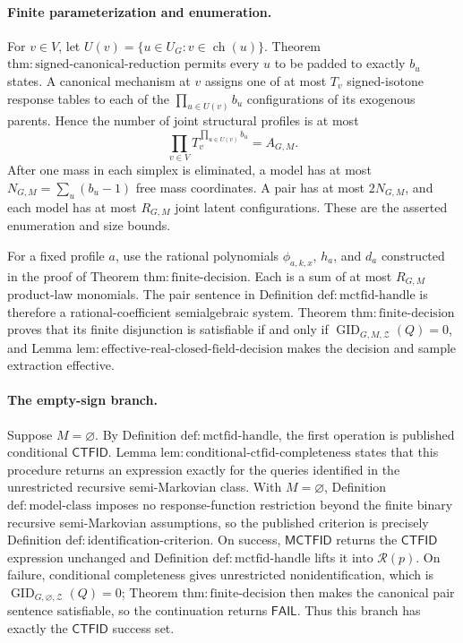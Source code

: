\paragraph{Finite parameterization and enumeration.}
For \(v\in V\), let \(U(v)=\{u\in U_G:v\in\operatorname{ch}(u)\}\).  Theorem \(\mathrm{thm:signed\text{-}canonical\text{-}reduction}\) permits every \(u\) to be padded to exactly \(b_u\) states.  A canonical mechanism at \(v\) assigns one of at most \(T_v\) signed-isotone response tables to each of the \(\prod_{u\in U(v)}b_u\) configurations of its exogenous parents.  Hence the number of joint structural profiles is at most
\[
 \prod_{v\in V}T_v^{\prod_{u\in U(v)}b_u}=A_{G,M}.
\]
After one mass in each simplex is eliminated, a model has at most \(N_{G,M}=\sum_u(b_u-1)\) free mass coordinates.  A pair has at most \(2N_{G,M}\), and each model has at most \(R_{G,M}\) joint latent configurations.  These are the asserted enumeration and size bounds.

For a fixed profile \(a\), use the rational polynomials \(\phi_{a,k,x}\), \(h_a\), and \(d_a\) constructed in the proof of Theorem \(\mathrm{thm:finite\text{-}decision}\).  Each is a sum of at most \(R_{G,M}\) product-law monomials.  The pair sentence in Definition \(\mathrm{def:mctfid\text{-}handle}\) is therefore a rational-coefficient semialgebraic system.  Theorem \(\mathrm{thm:finite\text{-}decision}\) proves that its finite disjunction is satisfiable if and only if \(\operatorname{GID}_{G,M,\mathcal Z}(Q)=0\), and Lemma \(\mathrm{lem:effective\text{-}real\text{-}closed\text{-}field\text{-}decision}\) makes the decision and sample extraction effective.

\paragraph{The empty-sign branch.}
Suppose \(M=\varnothing\).  By Definition \(\mathrm{def:mctfid\text{-}handle}\), the first operation is published conditional \(\mathsf{CTFID}\).  Lemma \(\mathrm{lem:conditional\text{-}ctfid\text{-}completeness}\) states that this procedure returns an expression exactly for the queries identified in the unrestricted recursive semi-Markovian class.  With \(M=\varnothing\), Definition \(\mathrm{def:model\text{-}class}\) imposes no response-function restriction beyond the finite binary recursive semi-Markovian assumptions, so the published criterion is precisely Definition \(\mathrm{def:identification\text{-}criterion}\).  On success, \(\mathsf{MCTFID}\) returns the \(\mathsf{CTFID}\) expression unchanged and Definition \(\mathrm{def:mctfid\text{-}handle}\) lifts it into \(\mathcal R(p)\).  On failure, conditional completeness gives unrestricted nonidentification, which is \(\operatorname{GID}_{G,\varnothing,\mathcal Z}(Q)=0\); Theorem \(\mathrm{thm:finite\text{-}decision}\) then makes the canonical pair sentence satisfiable, so the continuation returns \(\mathsf{FAIL}\).  Thus this branch has exactly the \(\mathsf{CTFID}\) success set.

